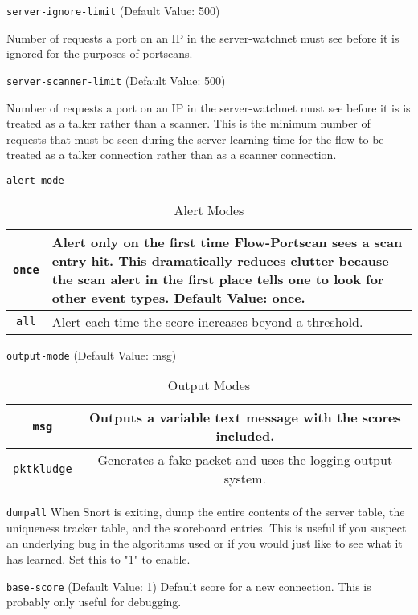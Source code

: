 \documentclass[english]{report}
\newcounter{slistnum}
\newenvironment{slist}
{ \begin{list}{ {\bf \arabic{slistnum}.} }{\usecounter{slistnum} } }
{ \end{list} }
\begin{document}
\begin{slist}
\item \texttt{server-ignore-limit} (Default Value: 500)

Number of requests a port on an IP in the server-watchnet must see
before it is ignored for the purposes of portscans. 

\item \texttt{server-scanner-limit} (Default Value: 500)

Number of requests a port on an IP in the server-watchnet must see before it is
is treated as a talker rather than a scanner.  This is the minimum number of
requests that must be seen during the server-learning-time for the flow to be
treated as a talker connection rather than as a scanner connection.  

\item \texttt{alert-mode}

\begin{table}[!hbpt]
\caption{Alert Modes}
\begin{center}\begin{tabular}{|c|p{5in}|}
\hline 
\texttt{once} & 
Alert only on the first time Flow-Portscan sees a scan entry hit.  This dramatically reduces clutter because the scan alert in the first place tells one to look for other event types. Default Value: once.
\\
\hline 
\texttt{all} & Alert each time the score increases beyond a threshold. \\
\hline
\end{tabular}\end{center}
\end{table}

\item \texttt{output-mode} (Default Value: msg)

\begin{table}[!hbpt]
\caption{Output Modes}
\begin{center}\begin{tabular}{|c|c|}
\hline 
\texttt{msg} & Outputs a variable text message with the scores included.  \\
\hline
\texttt{pktkludge} & Generates a fake packet and uses the logging output system. \\
\hline
\end{tabular}\end{center}
\end{table}

\item \texttt{dumpall}
When Snort is exiting, dump the entire contents of the server table,
the uniqueness tracker table, and the scoreboard entries.  This is
useful if you suspect an underlying bug in the algorithms used or if
you would just like to see what it has learned. Set this to "1" to
enable.
            
\item \texttt{base-score} (Default Value: 1)
Default score for a new connection. This is probably only useful for
debugging.

\end{slist}
\end{document}

